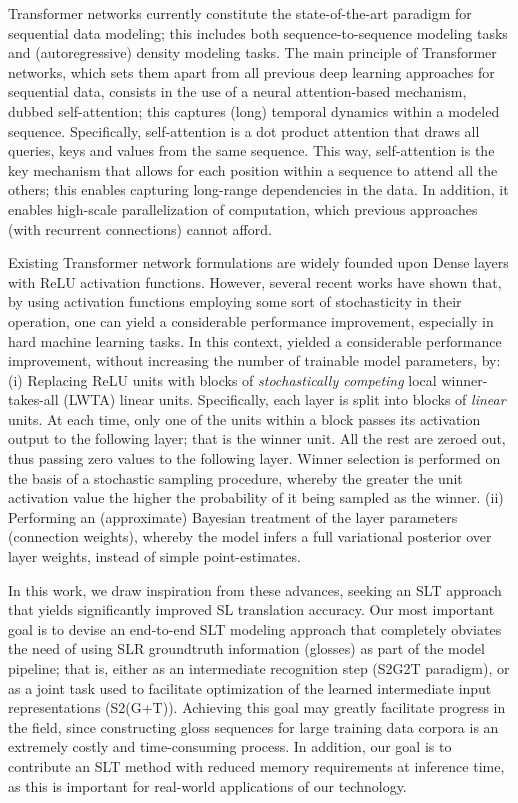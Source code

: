 \documentclass[10pt,twocolumn,letterpaper]{article}
\begin{document}
 Transformer networks \cite{Vaswani2017} currently constitute the state-of-the-art paradigm for sequential data modeling; this includes both sequence-to-sequence modeling tasks and (autoregressive) density modeling tasks. The main principle of Transformer networks, which sets them apart from all previous deep learning approaches for sequential data, consists in the use of a neural attention-based mechanism, dubbed self-attention; this captures (long) temporal dynamics within a modeled sequence. Specifically, self-attention is a dot product attention \cite{luong2015effective} that draws all queries, keys and values from the same sequence. This way, self-attention is the key mechanism that allows for each position within a sequence to attend all the others; this enables capturing long-range dependencies in the data. In addition, it enables high-scale parallelization of computation, which previous approaches (with recurrent connections) cannot afford.

Existing Transformer network formulations are widely founded upon Dense layers with ReLU activation functions. However, several recent works have shown that, by using activation functions employing some sort of stochasticity in their operation, one can yield a considerable performance improvement, especially in hard machine learning tasks. In this context, \cite{panousis2019nonparametric} yielded a considerable performance improvement, without increasing the number of trainable model parameters, by: (i) Replacing ReLU units with blocks of \emph{stochastically competing} local winner-takes-all (LWTA) linear units. Specifically, each layer is split into blocks of \emph{linear} units. At each time, only one of the units within a block passes its activation output to the following layer; that is the winner unit. All the rest are zeroed out, thus passing zero values to the following layer. Winner selection is performed on the basis of a stochastic sampling procedure, whereby the greater the unit activation value the higher the probability of it being sampled as the winner. (ii) Performing an (approximate) Bayesian treatment of the layer parameters (connection weights), whereby the model infers a full variational posterior over layer weights, instead of simple point-estimates.

In this work, we draw inspiration from these advances, seeking an SLT approach that yields significantly improved SL translation accuracy. Our most important goal is to devise an end-to-end SLT modeling approach that completely obviates the need of using SLR groundtruth information (glosses) as part of the model pipeline; that is, either as an intermediate recognition step (S2G2T paradigm), or as a joint task used to facilitate optimization of the learned intermediate input representations (S2(G+T)). Achieving this goal may greatly facilitate progress in the field, since constructing gloss sequences for large training data corpora is an extremely costly and time-consuming process. In addition, our goal is to contribute an SLT method with reduced memory requirements at inference time, as this is important for real-world applications of our technology.
\end{document}
